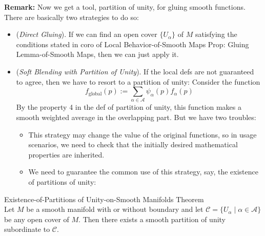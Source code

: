 \noindent\textbf{Remark:} Now we get a tool, partition of unity, for gluing smooth functions. There are basically two strategies to do so:
\begin{itemize}
    \item (\textit{Direct Gluing}). If we can find an open cover $\{U_\alpha\}$ of $M$ satisfying the conditions stated in coro of Local Behavior-of-Smooth Maps Prop: Gluing Lemma-of-Smooth Maps, then we can just apply it.

    \item (\textit{Soft Blending with Partition of Unity}). If the local defs are not guaranteed to agree, then we have to resort to a partition of unity: Consider the function
    \[
    f_{\text{global}} (p):= \sum_{\alpha \in \mathcal{A}} \psi_\alpha (p) f_\alpha(p)
    \]
    By the property 4 in the def of partition of unity, this function makes a smooth weighted average in the overlapping part. But we have two troubles:
    \begin{itemize}
        \item This strategy may change the value of the original functions, so in usage scenarios, we need to check that the initially desired mathematical properties are inherited.
        \item We need to guarantee the common use of this strategy, say, the existence of partitions of unity:
    \end{itemize}
\end{itemize}


\begin{theorem}{Existence-of-Partitions of Unity-on-Smooth Manifolds Theorem}\\
Let $M$ be a smooth manifold with or without boundary and let $\mathcal{C}= \{U_\alpha \mid \alpha\in \mathcal{A}\}$ be any open cover of $M$. Then there exists a smooth partition of unity subordinate to $\mathcal{C}$.
\end{theorem}


